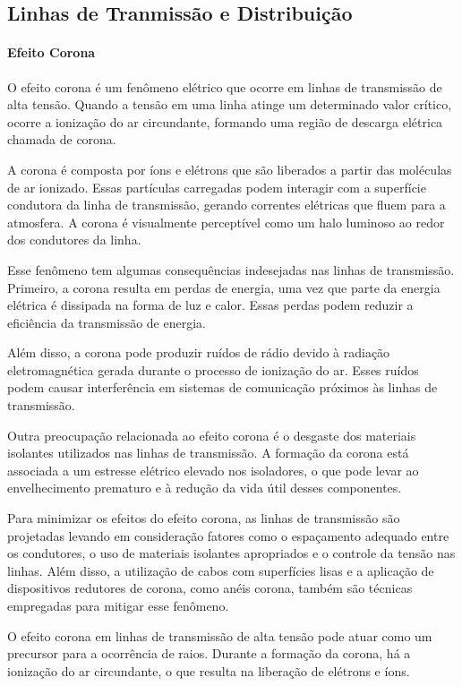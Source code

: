 \documentclass[a4paper, 12pt, onecolumn,singlespacing]{article}
\begin{document}
	\subsection{Linhas de Tranmissão e Distribuição}
	
	\paragraph{Efeito Corona}
	
	O efeito corona é um fenômeno elétrico que ocorre em linhas de transmissão de alta tensão. Quando a tensão em uma linha atinge um determinado valor crítico, ocorre a ionização do ar circundante, formando uma região de descarga elétrica chamada de corona.
	
	A corona é composta por íons e elétrons que são liberados a partir das moléculas de ar ionizado. Essas partículas carregadas podem interagir com a superfície condutora da linha de transmissão, gerando correntes elétricas que fluem para a atmosfera. A corona é visualmente perceptível como um halo luminoso ao redor dos condutores da linha.
	
	Esse fenômeno tem algumas consequências indesejadas nas linhas de transmissão. Primeiro, a corona resulta em perdas de energia, uma vez que parte da energia elétrica é dissipada na forma de luz e calor. Essas perdas podem reduzir a eficiência da transmissão de energia.
	
	Além disso, a corona pode produzir ruídos de rádio devido à radiação eletromagnética gerada durante o processo de ionização do ar. Esses ruídos podem causar interferência em sistemas de comunicação próximos às linhas de transmissão.
	
	Outra preocupação relacionada ao efeito corona é o desgaste dos materiais isolantes utilizados nas linhas de transmissão. A formação da corona está associada a um estresse elétrico elevado nos isoladores, o que pode levar ao envelhecimento prematuro e à redução da vida útil desses componentes.
	
	Para minimizar os efeitos do efeito corona, as linhas de transmissão são projetadas levando em consideração fatores como o espaçamento adequado entre os condutores, o uso de materiais isolantes apropriados e o controle da tensão nas linhas. Além disso, a utilização de cabos com superfícies lisas e a aplicação de dispositivos redutores de corona, como anéis corona, também são técnicas empregadas para mitigar esse fenômeno.
	
	O efeito corona em linhas de transmissão de alta tensão pode atuar como um precursor para a ocorrência de raios. Durante a formação da corona, há a ionização do ar circundante, o que resulta na liberação de elétrons e íons.
	
\end{document}
